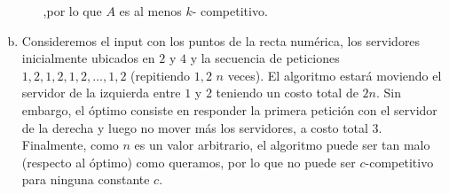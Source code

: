 \documentclass[dcc,uchile]{fcfmcourse}
\theoremstyle{plain}
\theoremstyle{definition}
\begin{document}
\begin{problems}
\begin{enumerate}[a)]
\begin{itemize}
    ,por lo que $A$ es al menos $k$- competitivo.
\end{itemize}
\item Consideremos el input con los puntos de la recta numérica, los servidores inicialmente ubicados en $2$ y $4$ y la secuencia de peticiones $1, 2, 1, 2, 1, 2, \ldots, 1, 2$ (repitiendo $1, 2$ $n$ veces). El algoritmo estará moviendo el servidor de la izquierda entre $1$ y $2$ teniendo un costo total de $2n$. Sin embargo, el óptimo consiste en responder la primera petición con el servidor de la derecha y luego no mover más los servidores, a costo total $3$. Finalmente, como $n$ es un valor arbitrario, el algoritmo puede ser tan malo (respecto al óptimo) como queramos, por lo que no puede ser $c$-competitivo para ninguna constante $c$.
\end{enumerate}
\end{problems}
\end{document}
